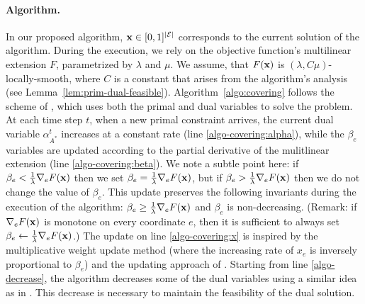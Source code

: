 \paragraph{Algorithm.}
In our proposed algorithm, $\mathbf{x} \in [0, 1]^{|\mathcal{E}|}$ corresponds to the current solution of the algorithm. During the execution, we rely on the objective function's multilinear extension $F$, parametrized by $\lambda$ and $\mu$. We assume, that $F(\mathbf{x})$ is $(\lambda, C \mu)$-locally-smooth, where $C$ is a constant that arises from the algorithm's analysis (see Lemma~\ref{lem:prim-dual-feasible}). Algorithm~\ref{algo:covering} follows the scheme of \cite{Thang20:Online-Primal-Dual}, which uses both the primal and dual variables to solve the problem. At each time step $t$, when a new primal constraint arrives, the current dual variable $\alpha^{t}_{A^*}$ increases at a constant rate (line \ref{algo-covering:alpha}), while the $\beta_e$ variables are updated according to the partial derivative of the mulitlinear extension (line \ref{algo-covering:beta}). We note a subtle point here: if $\beta_e < \frac{1}{\lambda} \nabla_{e} F(\mathbf{x})$ then we set
$\beta_e = \frac{1}{\lambda} \nabla_{e} F(\mathbf{x})$, but if $\beta_e > \frac{1}{\lambda} \nabla_{e} F(\mathbf{x})$ then we do not change the value of $\beta_e$. This update preserves the following invariants during the execution of the algorithm: $\beta_{e} \geq \frac{1}{\lambda} \nabla_{e} F(\mathbf{x})$ and $\beta_{e}$ is non-decreasing. (Remark: if $\nabla_{e} F(\mathbf{x})$ is monotone on every coordinate $e$, then it is sufficient to always set $\beta_{e} \gets \frac{1}{\lambda} \nabla_{e} F(\mathbf{x})$.)
The update on line \ref{algo-covering:x} is inspired by the multiplicative weight update method (where the increasing rate of $x_{e}$
is inversely proportional to $\beta_{e}$) and the updating approach of \cite{BamasMaggiori20:The-Primal-Dual-method}.
Starting from line \ref{algo-decrease}, the algorithm decreases some of the dual variables using a similar idea as in
\cite{AzarBuchbinder16:Online-Algorithms}. This decrease is necessary to maintain the feasibility of the dual solution.


